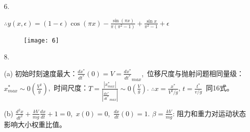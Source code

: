 \documentclass[a4paper,12pts,notitlepage]{ctexart}
\begin{document}
	
	6.
	
	$\therefore y(x,\epsilon) = (1-\epsilon)\cos(\pi x) - \frac{\sin(\pi x)}{\pi(\pi^2-1)} + \frac{\sin x}{\pi^2-1}+\epsilon$
	
	\begin{figure}[H]
		\centering
		\texttt{[image: 6]}
		\label{fig:6}
	\end{figure}
	
		
	8.

	(a)
	初始时刻速度最大：$\frac{dx^*}{dt^*}(0) = V = \frac{dx^*}{dt^*}_{max}$,\ 
	位移尺度与抛射问题相同量级：$x^*_{max}\sim0(\frac{V^2}{g})$,\
	时间尺度：$T = \frac{|x^*_{max}|}{|\frac{dx^*}{dt^*}_{max}|}\sim0(\frac{V}{g})$.\quad
	$\therefore x = \frac{x^*}{V^2/g}$, $t = \frac{t^*}{v/g}$\ 同16式。
	
	(b)
	$\frac{d^2x}{dt^2} + \frac{kV}{mg} \frac{dx}{dt} + 1 = 0 $,\ 
	$x(0) = 0$,\
	$\frac{dx}{dt}(0) = 1$.\quad
	$\beta=\frac{kV}{mg}$: 阻力和重力对运动状态影响大小权重比值。
	
\end{document}
